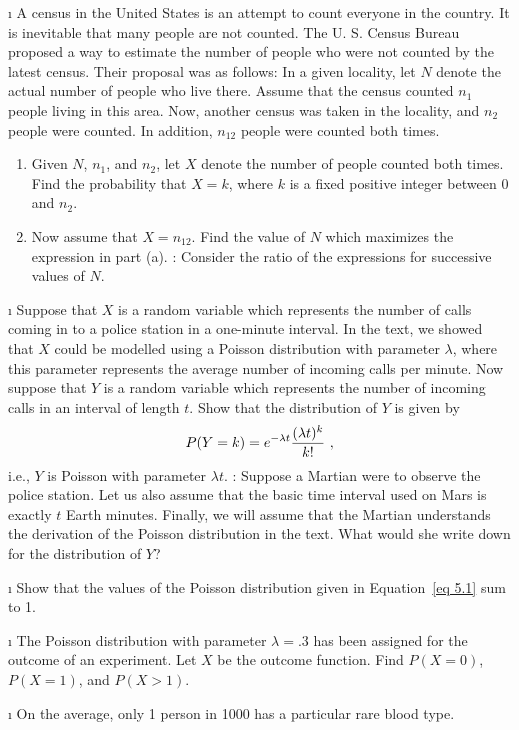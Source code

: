 \begin{LJSItem}
\i\label{exercise 5.1.107} A census in the United States is an attempt to count
everyone in the country.  It is inevitable that many people are not counted.  The U.
S. Census Bureau proposed a way to estimate the number of people who were not
counted by the latest census.  Their proposal was as follows:  In a given locality,
let $N$ denote the actual number of people who live there.  Assume that the census
counted $n_1$ people living in this area.  Now, another census was taken in the
locality, and $n_2$ people were counted.  In addition, $n_{12}$ people were counted
both times.  
\begin{enumerate}
\item Given $N$, $n_1$, and $n_2$, let $X$ denote the number of people counted both
times. Find the probability that $X = k$, where $k$ is a fixed positive integer
between 0 and $n_2$.
\item Now assume that $X = n_{12}$.  Find the value of $N$ which maximizes the
expression in part (a).   :  Consider the ratio of the expressions for 
successive values of $N$.
\end{enumerate}

\i\label{exer 5.1.26} Suppose that $X$ is a random variable which represents the
number of calls coming in to a police station in a one-minute interval.  In the text,
we showed that $X$ could be modelled using a Poisson distribution with parameter
$\lambda$, where this parameter represents the average number of incoming calls per
minute.  Now suppose that $Y$ is a random variable which represents the number of
incoming calls in an interval of length $t$.  Show that the distribution of
$Y$ is given by
$$P(Y = k) = e^{-\lambda t}{{(\lambda t)^k}\over{k!}}\ ,$$  i.e., $Y$ is Poisson with
parameter $\lambda t$.   :  Suppose a Martian were to observe the police 
station.  Let us also assume that the basic time interval used on Mars is exactly $t$ 
Earth minutes.  Finally, we will assume that the Martian understands the derivation of 
the Poisson distribution in the text.  What would she write down for the distribution of
$Y$?

\i\label{exer 5.1.27} Show that the values of the Poisson distribution given in
Equation~\ref{eq 5.1} sum to 1.

\i\label{exer 5.1.108} The Poisson distribution with parameter $\lambda = .3$ has
been assigned for the outcome of an experiment.  Let $X$ be the outcome function.  
Find $P(X = 0)$, $P(X = 1)$, and $P(X > 1)$.

\i\label{exer 5.1.109} On the average, only 1 person in 1000 has a particular rare
blood type.


\end{LJSItem}
